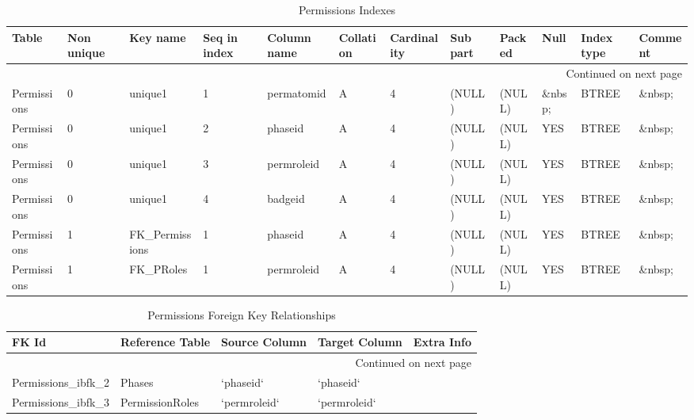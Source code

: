 \documentclass[tablesignature,landscape]{scrartcl}
\begin{document}
\begin{longtable}{|l|l|l|l|l|l|l|l|l|l|l|l|}
\caption{Permissions Indexes} \label{tbl:permissionsindexes}\\
\hline
 Table        &  Non unique  &  Key name           &  Seq in index  &  Column name   &  Collation  &  Cardinality  &  Sub part  &  Packed  &  Null     &  Index type  &  Comment \\
\hline
\endhead
\hline\multicolumn{12}{r}{Continued on next page}\
\endfoot
\endlastfoot
\hline
 Permissions  &           0  &  PRIMARY            &             1  &  permissionid  &  A          &            4  &  (NULL)    &  (NULL)  &  \&nbsp;  &  BTREE       &  \&nbsp;  \\
 Permissions  &           0  &  unique1            &             1  &  permatomid    &  A          &            4  &  (NULL)    &  (NULL)  &  \&nbsp;  &  BTREE       &  \&nbsp;  \\
 Permissions  &           0  &  unique1            &             2  &  phaseid       &  A          &            4  &  (NULL)    &  (NULL)  &  YES      &  BTREE       &  \&nbsp;  \\
 Permissions  &           0  &  unique1            &             3  &  permroleid    &  A          &            4  &  (NULL)    &  (NULL)  &  YES      &  BTREE       &  \&nbsp;  \\
 Permissions  &           0  &  unique1            &             4  &  badgeid       &  A          &            4  &  (NULL)    &  (NULL)  &  YES      &  BTREE       &  \&nbsp;  \\
 Permissions  &           1  &  FK\_{}Permissions  &             1  &  phaseid       &  A          &            4  &  (NULL)    &  (NULL)  &  YES      &  BTREE       &  \&nbsp;  \\
 Permissions  &           1  &  FK\_{}PRoles       &             1  &  permroleid    &  A          &            4  &  (NULL)    &  (NULL)  &  YES      &  BTREE       &  \&nbsp;  \\
\hline
\end{longtable}


\begin{longtable}{|l|l|l|l|l|}
\caption{Permissions Foreign Key Relationships} \label{tbl:permissionsfkr}\\
\hline
 FK Id                     &  Reference Table  &  Source Column  &  Target Column  &  Extra Info \\
\hline
\endhead
\hline\multicolumn{5}{r}{Continued on next page}\
\endfoot
\endlastfoot
\hline
 Permissions\_{}ibfk\_{}1  &  PermissionAtoms  &  `permatomid`   &  `permatomid`   &              \\
 Permissions\_{}ibfk\_{}2  &  Phases           &  `phaseid`      &  `phaseid`      &              \\
 Permissions\_{}ibfk\_{}3  &  PermissionRoles  &  `permroleid`   &  `permroleid`   &              \\
\hline
\end{longtable}
\end{document}
